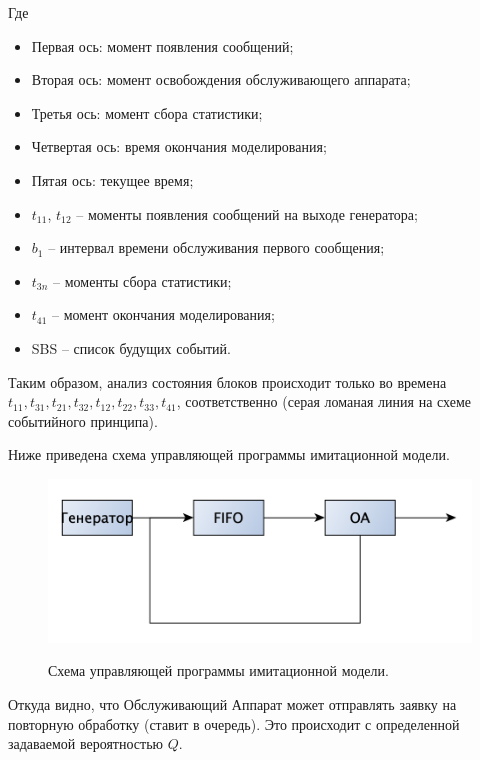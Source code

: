 \documentclass[a4paper,12pt]{article}
\begin{document}
	Где 
	\begin{itemize}
		\item Первая ось: момент появления сообщений;
		\item Вторая ось: момент освобождения обслуживающего аппарата;
		\item Третья ось: момент сбора статистики;
		\item Четвертая ось: время окончания моделирования;
		\item Пятая ось: текущее время;
		\item $t_{11}$, $t_{12}$ – моменты появления сообщений на выходе генератора; \item $b_1$ – интервал времени обслуживания первого сообщения;
		\item $t_{3n}$ – моменты сбора статистики;
		\item $t_{41}$ – момент окончания моделирования;
		\item SBS – список будущих событий.
	\end{itemize}

	Таким образом, анализ состояния блоков происходит только во времена $t_{11}, t_{31}, t_{21}, t_{32}, t_{12}, t_{22}, t_{33}, t_{41}$, соответственно (серая ломаная линия на схеме событийного принципа).
	
	\newpage
	
	Ниже приведена схема управляющей программы имитационной модели.
	
	\begin{figure}[h!]
		\begin{center}
			{\includegraphics[scale = 0.6]{imit.png}}
			\label{ris:imit}
		\end{center}
		\caption{Схема управляющей программы имитационной модели.}
	\end{figure}

	Откуда видно, что Обслуживающий Аппарат может отправлять заявку на повторную обработку (ставит в очередь). Это происходит с определенной задаваемой вероятностью $Q$.
	
\end{document}
